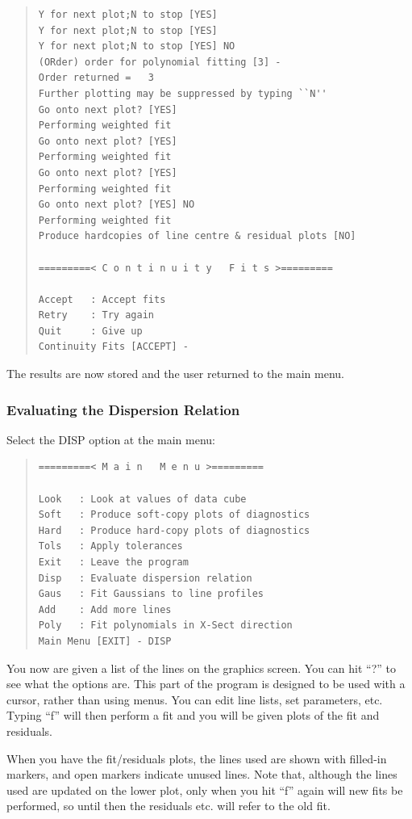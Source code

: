 \documentclass[11pt,twoside]{article}
\newcommand{\xlabel}[1]{}
\begin{document}
\begin{quote}\begin{verbatim}
Y for next plot;N to stop [YES]
Y for next plot;N to stop [YES]
Y for next plot;N to stop [YES] NO
(ORder) order for polynomial fitting [3] -
Order returned =   3
Further plotting may be suppressed by typing ``N''
Go onto next plot? [YES]
Performing weighted fit
Go onto next plot? [YES]
Performing weighted fit
Go onto next plot? [YES]
Performing weighted fit
Go onto next plot? [YES] NO
Performing weighted fit
Produce hardcopies of line centre & residual plots [NO]

=========< C o n t i n u i t y   F i t s >=========

Accept   : Accept fits
Retry    : Try again
Quit     : Give up
Continuity Fits [ACCEPT] -
\end{verbatim}\end{quote}

The results are now stored and the user returned to the main menu.

\subsubsection{\xlabel{evaluating_the_dispersion_relation}%
Evaluating the Dispersion Relation}

Select the DISP option at the main menu:

\begin{quote}\begin{verbatim}
=========< M a i n   M e n u >=========

Look   : Look at values of data cube
Soft   : Produce soft-copy plots of diagnostics
Hard   : Produce hard-copy plots of diagnostics
Tols   : Apply tolerances
Exit   : Leave the program
Disp   : Evaluate dispersion relation
Gaus   : Fit Gaussians to line profiles
Add    : Add more lines
Poly   : Fit polynomials in X-Sect direction
Main Menu [EXIT] - DISP
\end{verbatim}\end{quote}

You now are given a list of the lines on the graphics screen. You can
hit ``?'' to see what the options are. This part of the program is
designed to be used with a cursor, rather than using menus. You can
edit line lists, set parameters, etc. Typing ``f'' will then perform a
fit and you will be given plots of the fit and residuals.

When you have the fit/residuals plots, the lines used are shown with
filled-in markers, and open markers indicate unused lines. Note that,
although the lines used are updated on the lower plot, only when you
hit ``f'' again will new fits be performed, so until then the
residuals etc. will refer to the old fit.
\end{document}
